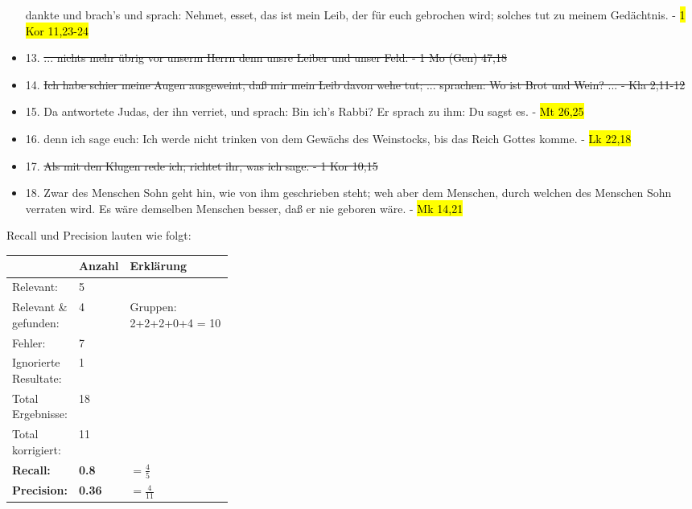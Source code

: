 \begin{itemize}[noitemsep]
	dankte und brach's und sprach: Nehmet, esset, das ist mein Leib, der für euch gebrochen wird; solches tut zu meinem Gedächtnis. - \hl{1 Kor 11,23-24}
	\item 13.	\st{... nichts mehr übrig vor unserm Herrn denn unsre Leiber und unser Feld. - 1 Mo (Gen) 47,18}
	\item 14.	\st{Ich habe schier meine Augen ausgeweint, daß mir mein Leib davon wehe tut; ...
	sprachen: Wo ist Brot und Wein? ... - Kla 2,11-12}
	\item 15.	Da antwortete Judas, der ihn verriet, und sprach: Bin ich's Rabbi? Er sprach zu ihm: Du sagst es. - \hl{Mt 26,25}
	\item 16.	denn ich sage euch: Ich werde nicht trinken von dem Gewächs des Weinstocks, bis das Reich Gottes komme. - \hl{Lk 22,18}
	\item 17.	\st{Als mit den Klugen rede ich; richtet ihr, was ich sage. - 1 Kor 10,15}
	\item 18.	Zwar des Menschen Sohn geht hin, wie von ihm geschrieben steht; weh aber dem Menschen, durch welchen des Menschen Sohn verraten wird. Es wäre demselben Menschen besser, daß er nie geboren wäre. - \hl{Mk 14,21}
\end{itemize}

Recall und Precision lauten wie folgt:
\begin{table}[H]
	\centering
	\small\renewcommand{\arraystretch}{1.4}
	\label{tab:index_abendmahl}
	\begin{tabularx}{0.7\textwidth}{ L{0.22\linewidth} | L{0.1\linewidth} | X }%
		\hline
		 & Anzahl & Erklärung \\ \hline \hline
		Relevant: & 5 & \\
		Relevant \& gefunden: & 4 & Gruppen: 2+2+2+0+4 = 10\\
		Fehler: & 7 & \\
		Ignorierte Resultate: & 1 & \\
		Total Ergebnisse: & 18 & \\
		Total korrigiert: & 11 & \\
		\hline
		\textbf{Recall:} & \textbf{0.8} & $= \frac{4}{5}$\\
		\textbf{Precision:} & \textbf{0.36} & $= \frac{4}{11}$ \\
		\hline\hline
	\end{tabularx}
\end{table}




